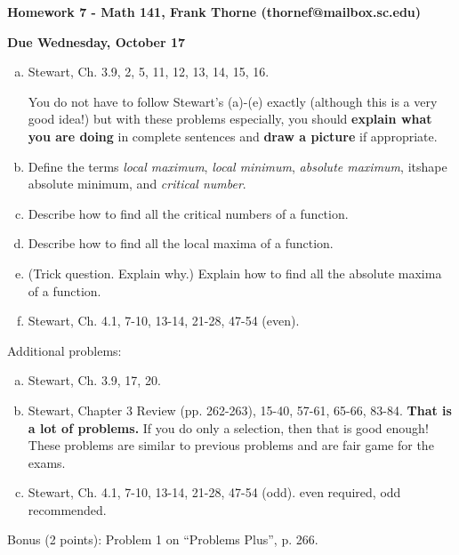 \documentclass[12pt]{article}
\begin{document}
\setlength{\topmargin}{-2mm}





\begin{center}{\bf Homework 7 - Math 141, Frank Thorne (thornef@mailbox.sc.edu)}
\end{center}
\begin{center}
{\bf Due Wednesday, October 17}
\end{center}

\begin{enumerate}[(a)]

\item
Stewart, Ch. 3.9, 2, 5, 11, 12, 13, 14, 15, 16.

You do not have to follow Stewart's
(a)-(e) exactly (although this is a very good idea!) but with these problems especially, 
you should {\bf explain what you are doing}
in complete sentences and {\bf draw a picture} if appropriate.

\item
Define the terms {\itshape local maximum}, {\itshape local minimum}, {\itshape absolute maximum},
{itshape absolute minimum}, and {\itshape critical number}.

\item
Describe how to find all the critical numbers of a function.

\item
Describe how to find all the local maxima of a function.

\item
(Trick question. Explain why.) Explain how to find all the absolute maxima of a function.

\item
Stewart, Ch. 4.1, 7-10, 13-14, 21-28, 47-54 (even).
\end{enumerate}
Additional problems: 
\begin{enumerate}[(a)]
\item
Stewart, Ch. 3.9, 17, 20.

\item
Stewart, Chapter 3 Review (pp. 262-263), 15-40, 57-61, 65-66, 83-84.
{\bf That is a lot of problems.} If you do only a selection, then that is good
enough! These problems are similar to previous problems and are fair game
for the exams.

\item
Stewart, Ch. 4.1, 7-10, 13-14, 21-28, 47-54 (odd).
 even required, odd recommended.

\end{enumerate}
Bonus (2 points): Problem 1 on ``Problems Plus'', p. 266.
\end{document}
